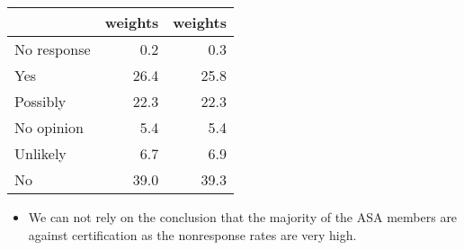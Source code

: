 \documentclass[12pt]{article}
\begin{document}
\begin{enumerate}
{\begin{minipage}[t]{0.97\linewidth}
{\begin{center}
\begin{tabular}{lrr}
&weights& weights\\
\hline
No response &0.2& 0.3\\
Yes& 26.4 &25.8\\
Possibly& 22.3 &22.3\\
No opinion& 5.4 &5.4\\
Unlikely& 6.7& 6.9\\
No &39.0 &39.3\\
\end{tabular}
\end{center}
}
\begin{itemize}
\item We can not rely on the conclusion that the majority of the ASA members are against certification as the nonresponse rates are very high. 
\end{itemize}
\end{minipage}}
\end{enumerate} 
\end{document}
